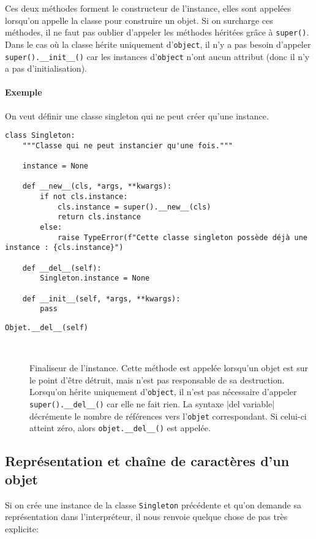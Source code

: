 Ces deux méthodes forment le constructeur\label{constructeur} de l'instance, elles sont appelées lorsqu'on appelle la classe pour construire un objet. Si on surcharge ces méthodes, il ne faut pas oublier d'appeler les méthodes héritées grâce à \texttt{super()}. Dans le cas où la classe hérite uniquement d'\texttt{object}, il n'y a pas besoin d'appeler \texttt{super().__init__()} car les instances d'\texttt{object} n'ont aucun attribut (donc il n'y a pas d'initialisation).

\paragraph{Exemple} On veut définir une classe \og singleton \fg{} qui ne peut créer qu'une instance.

\begin{verbatim}
class Singleton:
    """Classe qui ne peut instancier qu'une fois."""

    instance = None

    def __new__(cls, *args, **kwargs):
        if not cls.instance:
            cls.instance = super().__new__(cls)
            return cls.instance
        else:
            raise TypeError(f"Cette classe singleton possède déjà une instance : {cls.instance}")

    def __del__(self):
        Singleton.instance = None

    def __init__(self, *args, **kwargs):
        pass
\end{verbatim}

\begin{description}
    \item[\texttt{Objet.__del__(self)}]~

    Finaliseur de l'instance. Cette méthode est appelée lorsqu'un objet est sur le point d'être détruit, mais n'est pas responsable de sa destruction. Lorsqu'on hérite uniquement d'\texttt{object}, il n'est pas nécessaire d'appeler \texttt{super().__del__()} car elle ne fait rien. La syntaxe |del variable| décrémente le nombre de références vers l'\texttt{objet} correspondant. Si celui-ci atteint zéro, alors \texttt{objet.__del__()} est appelée.
\end{description}

\subsection{Représentation et chaîne de caractères d'un objet}
Si on crée une instance de la classe \texttt{Singleton} précédente et qu'on demande sa représentation dans l'interpréteur, il nous renvoie quelque chose de pas très explicite:

